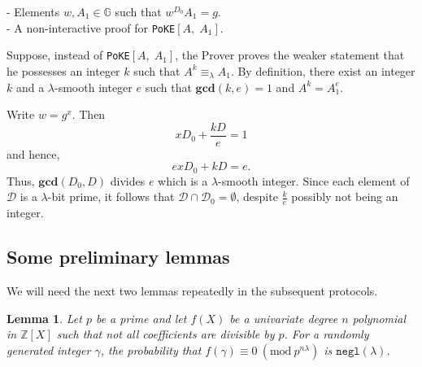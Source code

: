 \documentclass[11pt, lettersize, notitlepage, leqno, footskip=0.6cm]{article}
\newcommand{\bz}{\mathbb Z}
\newcommand{\ttt}{\texttt}
\newcommand{\eqlam}{\equiv_{\lam}}
\newcommand{\mc}{\mathcal}
\newcommand{\mb}{\mathbb}
\newcommand{\mbf}{\mathbf}
\newcommand{\lam}{\lambda}
\newcommand{\vs}{\vspace{-0.15cm}}
\newcommand{\noin}{\noindent}
\newcommand{\Mod}[1]{\ (\mathrm{mod}\ #1)}
\newcommand{\GCD}{\mbf{gcd}}
\newtheorem{Lem}[Thm]{Lemma}
\numberwithin{equation}{section}
\begin{document}
\noin - Elements $w, A_1\in\mb{G}$ such that $w^{D_0}A_1 = g$.\\
- A non-interactive proof for \verb|PoKE|$[A,\; A_1]$.

Suppose, instead of \verb|PoKE|$[A,\; A_1]$, the Prover proves the weaker statement that he possesses an integer $k$ such that $A^k \eqlam A_1$. By definition, there exist an integer $k$ and a $\lam$-smooth integer $e$ such that $\GCD(k,e) = 1$ and $A^{k} = A_1^e$.

Write $w = g^x$. Then \vs $$ x D_0 +  
\frac{kD}{e} = 1 $$ and hence, \vs $$ex D_0 +  kD = e .$$ Thus, $\GCD(D_0, D)$ divides $e$ which is a $\lam$-smooth integer. Since each element of $\mc{D}$ is a $\lam$-bit prime, it follows that $\mc{D}\cap \mc{D}_0 = \emptyset$, despite $\frac{k}{e}$ possibly not being an integer.

\subsection{\fontsize{11}{11}\selectfont Some preliminary lemmas }

\noin We will need the next two lemmas repeatedly in the subsequent protocols.

\begin{Lem} Let $p$ be a prime and let $f(X)$ be a univariate degree $n$ polynomial in $\bz[X]$ such that not all coefficients are divisible by $p$. For a randomly generated integer $\gamma$, the probability that $f(\gamma)\equiv 0\Mod{p^{n\lam}}$ is \normalfont $\ttt{negl}(\lam)$. \end{Lem}
\end{document}

